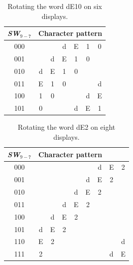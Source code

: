 \documentclass[epsfig,10pt,fullpage]{article}
\begin{document}
\begin{table}[h]
\begin{minipage}[t]{12.5 cm}
\begin{center}
\begin{tabular}{c|cccccc}
{\it SW}$_{9-7}$ & \multicolumn{6}{c}{Character pattern} \\
\hline
{\rule[0mm]{0mm}{5mm}000 } & & & d & E & 1 & 0 \\ 
001 & & d & E & 1 & 0 & \\
010 & d & E & 1 & 0 & & \\
011 & E & 1 & 0 & & & d\\
100 & 1 & 0 & & & d & E \\
101 & 0 & & & d  & E & 1 \\
\end{tabular}
\end{center}
\end{minipage}
\caption{Rotating the word dE10 on six displays.}
\label{tab:rotate2}
\end{table}

\begin{table}[ht]
\begin{minipage}[t]{12.5 cm}
\begin{center}
\begin{tabular}{c|cccccccc}
{\it SW}$_{9-7}$ & \multicolumn{6}{c}{Character pattern} \\
\hline
{\rule[0mm]{0mm}{5mm}000 } & & & & & & d & E & 2 \\ 
001 & & & & & d & E & 2 & \\
010 & & & & d & E & 2 & & \\
011 & & & d & E & 2 & & & \\
100 & & d & E & 2 & & & & \\
101 & d & E & 2 & & & & &  \\
110 & E & 2 & & & & & & d \\
111 & 2 & & & & & & d & E \\
\end{tabular}
	\caption{Rotating the word dE2 on eight displays.}
	\label{tab:rotate3}
\end{center}
\end{minipage}
\end{table}
\end{document}

